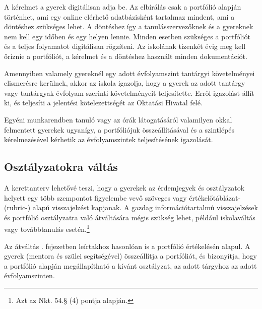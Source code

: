 A kérelmet a gyerek digitálisan adja be. Az elbírálás csak a portfólió alapján történhet, ami egy online elérhető adatbázisként tartalmaz mindent, ami a döntéshez szükséges lehet. A döntéshez így a tanulásszervezőknek és a gyereknek nem kell egy időben és egy helyen lennie. Minden esetben szükséges a portfóliót és a teljes folyamatot digitálisan rögzíteni. Az iskolának tizenkét évig meg kell őriznie a portfóliót, a kérelmet és a döntéshez használt minden dokumentációt.

Amennyiben valamely gyereknél egy adott évfolyamszint tantárgyi követelményei elismerésre kerülnek, akkor az iskola igazolja, hogy a gyerek az adott tantárgy vagy tantárgyak évfolyam szerinti követelményeit teljesítette. Erről igazolást állít ki, és teljesíti a jelentési kötelezettségét az Oktatási Hivatal felé.

Egyéni munkarendben tanuló vagy az órák látogatásáról valamilyen okkal felmentett gyerekek ugyanígy, a portfóliójuk összeállításával és a szintlépés kérelmezésével kérhetik az évfolyamszintek teljesítésének igazolását.

\subsection{Osztályzatokra váltás}
\label{sec:osztalyzatok}
A kerettanterv lehetővé teszi, hogy a gyerekek az érdemjegyek és osztályzatok helyett egy több szempontot figyelembe vevő szöveges vagy értékelőtáblázat- (rubric-) alapú visszajelzést kapjanak. A gazdag információtartalmú visszajelzések és portfólió osztályzatra való átváltására mégis szükség lehet, például iskolaváltás vagy továbbtanulás esetén.\footnote{Azt az Nkt. 54.§ (4) pontja alapján.}

Az átváltás . fejezetben leírtakhoz hasonlóan is a portfólió értékelésén alapul. A gyerek (mentora és szülei segítségével) összeállítja a portfóliót, és bizonyítja, hogy a portfólió alapján megállapítható a kívánt osztályzat, az adott tárgyhoz az adott évfolyamszinten.
